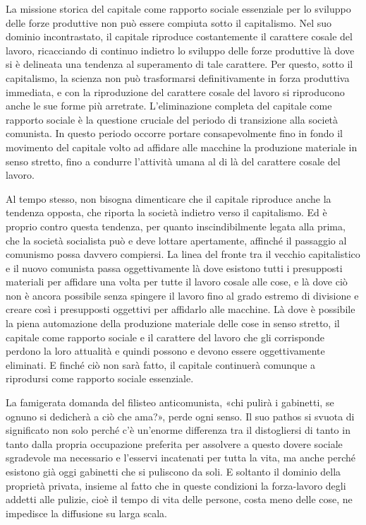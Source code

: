 \documentclass[12pt,a4paper,openany]{book}
\begin{document}
La missione storica del capitale come rapporto sociale essenziale per lo sviluppo delle forze produttive non può essere compiuta sotto il capitalismo. Nel suo dominio incontrastato, il capitale riproduce costantemente il carattere cosale del lavoro, ricacciando di continuo indietro lo sviluppo delle forze produttive là dove si è delineata una tendenza al superamento di tale carattere. Per questo, sotto il capitalismo, la scienza non può trasformarsi definitivamente in forza produttiva immediata, e con la riproduzione del carattere cosale del lavoro si riproducono anche le sue forme più arretrate. L'eliminazione completa del capitale come rapporto sociale è la questione cruciale del periodo di transizione alla società comunista. In questo periodo occorre portare consapevolmente fino in fondo il movimento del capitale volto ad affidare alle macchine la produzione materiale in senso stretto, fino a condurre l'attività umana al di là del carattere cosale del lavoro.

Al tempo stesso, non bisogna dimenticare che il capitale riproduce anche la tendenza opposta, che riporta la società indietro verso il capitalismo. Ed è proprio contro questa tendenza, per quanto inscindibilmente legata alla prima, che la società socialista può e deve lottare apertamente, affinché il passaggio al comunismo possa davvero compiersi. La linea del fronte tra il vecchio capitalistico e il nuovo comunista passa oggettivamente là dove esistono tutti i presupposti materiali per affidare una volta per tutte il lavoro cosale alle cose, e là dove ciò non è ancora possibile senza spingere il lavoro fino al grado estremo di divisione e creare così i presupposti oggettivi per affidarlo alle macchine. Là dove è possibile la piena automazione della produzione materiale delle cose in senso stretto, il capitale come rapporto sociale e il carattere del lavoro che gli corrisponde perdono la loro attualità e quindi possono e devono essere oggettivamente eliminati. E finché ciò non sarà fatto, il capitale continuerà comunque a riprodursi come rapporto sociale essenziale.

La famigerata domanda del filisteo anticomunista, «chi pulirà i gabinetti, se ognuno si dedicherà a ciò che ama?», perde ogni senso. Il suo pathos si svuota di significato non solo perché c'è un'enorme differenza tra il distogliersi di tanto in tanto dalla propria occupazione preferita per assolvere a questo dovere sociale sgradevole ma necessario e l'esservi incatenati per tutta la vita, ma anche perché esistono già oggi gabinetti che si puliscono da soli. E soltanto il dominio della proprietà privata, insieme al fatto che in queste condizioni la forza-lavoro degli addetti alle pulizie, cioè il tempo di vita delle persone, costa meno delle cose, ne impedisce la diffusione su larga scala.
\end{document}

